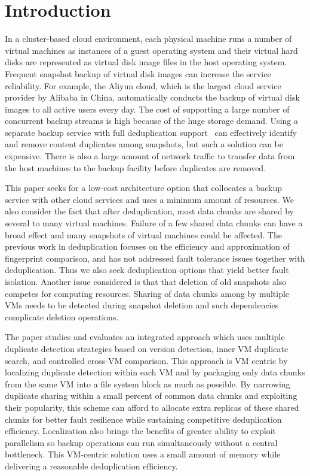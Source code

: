 \section{Introduction}
In a cluster-based cloud environment,
each physical machine runs a number  of virtual machines as  instances of a guest operating system 
and their  virtual hard disks are represented as virtual disk image files in the host operating system.
Frequent  snapshot backup of virtual disk images  can increase  the service reliability. 
For example, the Aliyun cloud, which is  the largest cloud service provider by Alibaba in China, 
automatically conducts  the backup of virtual disk images to all active users every day.
The cost of supporting a large number of concurrent backup streams is high
because of the huge storage demand. 
Using a separate  backup service with full deduplication support~\cite{venti02,bottleneck08}
can effectively identify and remove content duplicates among snapshots, 
but such a solution can be expensive. There is also a large amount of 
network traffic to transfer  data from the host machines to the backup facility
before duplicates are removed.

This paper seeks for a low-cost architecture option  that collocates
a backup service with other cloud services and  uses a minimum amount of resources. 
We also consider the fact that after
deduplication, most data chunks are shared by several to many virtual machines.
Failure of a few shared data chunks can have a 
broad effect and many
snapshots of virtual machines could be affected.
The previous work in deduplication focuses on the efficiency and approximation of
fingerprint comparison, and has not addressed fault tolerance issues  together with deduplication.
Thus we also seek deduplication options that yield better fault isolation.
Another issue considered is that
that deletion of old snapshots also competes for computing resources. 
Sharing of data chunks among by multiple VMs needs to be detected during
snapshot   deletion and such dependencies complicate deletion operations. 

The paper studies and evaluates  an integrated approach which uses  multiple duplicate detection strategies
based on  version  detection, inner VM duplicate search,
and controlled cross-VM comparison. 
This approach is VM centric by localizing duplicate detection within each VM  
and by packaging only data chunks from the same VM into a file system block as much as possible.
By narrowing duplicate sharing within a small percent of common data chunks and exploiting their popularity,
this scheme can afford to allocate extra replicas of these shared chunks for better
fault resilience while sustaining competitive deduplication efficiency.
Localization also brings the benefits of greater ability to exploit parallelism so
backup operations can run simultaneously without a central  bottleneck.
This  VM-centric solution uses  a small amount of  memory while delivering a reasonable deduplication efficiency. 


